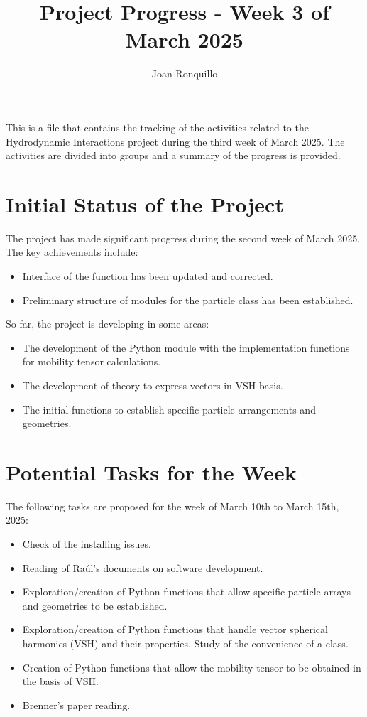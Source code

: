 \documentclass[12pt]{article}
\begin{document}
\author{Joan Ronquillo}

\title{Project Progress - Week 3 of March 2025}
\maketitle

This is a file that contains the tracking of the activities
related to the Hydrodynamic Interactions project during the
third week of March 2025. The activities are divided into
groups and a summary of the progress is provided.

\section{Initial Status of the Project}
The project has made significant progress during the second week of March 2025. The key achievements include:
\begin{itemize}
    \item Interface of the  function has been updated and corrected.
    \item Preliminary structure of modules for the particle class has been established.
\end{itemize}
So far, the project is developing in some areas:
\begin{itemize}
    \item The development of the Python module with the implementation functions for mobility tensor calculations.
    \item The development of theory to express vectors in VSH basis.
    \item The initial functions to establish specific particle arrangements and geometries.
\end{itemize}

\section{Potential Tasks for the Week}
The following tasks are proposed for the week of March 10th to March 15th, 2025:
\begin{itemize}
    \item Check of the  installing issues.
    \item Reading of Raúl's documents on software development.
    \item Exploration/creation of Python functions that allow specific particle arrays and geometries to be established.
    \item Exploration/creation of Python functions that handle vector spherical harmonics (VSH) and their properties. Study of the convenience of a class.
    \item Creation of Python functions that allow the mobility tensor to be obtained in the basis of VSH.
    \item Brenner's paper \cite{BRENNER1961242} reading.
\end{itemize}
\end{document}
